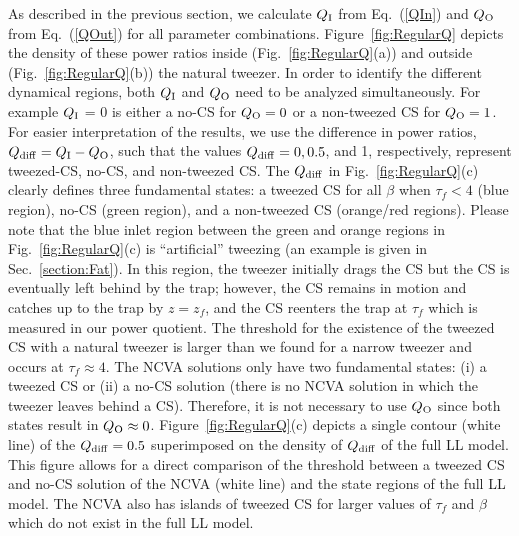 \documentclass[aps,floatfix,showpacs,preprintnumbers,twocolumn,nofootinbib]{revtex4}
\begin{document}
As described in the previous section, we calculate $Q_{\rm I}$ from Eq.~(\ref{QIn}) and $Q_{\rm O}$ from Eq.~(\ref{QOut}) for all parameter combinations.  Figure~\ref{fig:RegularQ} depicts the density of these power ratios inside (Fig.~\ref{fig:RegularQ}(a)) and outside (Fig.~\ref{fig:RegularQ}(b)) the natural tweezer.  In order to identify the different dynamical regions, both $Q_{\rm I}$ and $Q_{\rm O}$ need to be analyzed simultaneously.  For example $Q_{\rm I}$ = 0 is either a no-CS for $Q_{\rm O}=0$ or a non-tweezed CS for $Q_{\rm O}=1$.  For easier interpretation of the results, we use the difference in power ratios, $Q_{\rm diff} = Q_{\rm I} - Q_{\rm O}$, such that the values $Q_{\rm diff} = 0, 0.5$, and 1, respectively, represent tweezed-CS, no-CS, and non-tweezed CS.  The $Q_{\rm diff}$ in Fig.~\ref{fig:RegularQ}(c) clearly defines three fundamental states: a tweezed CS for all $\beta$ when $\tau_f < 4$ (blue region), no-CS (green region), and a non-tweezed CS (orange/red regions).  Please note that the blue inlet region between the green and orange regions in Fig.~\ref{fig:RegularQ}(c) is ``artificial'' tweezing (an example is given in Sec.~\ref{section:Fat}).  In this region, the tweezer initially drags the CS but the CS is eventually left behind by the trap; however, the CS remains in motion and catches up to the trap by $z = z_f$, and the CS reenters the trap at $\tau_f$ which is measured in our power quotient.  The threshold for the existence of the tweezed CS with a natural tweezer is larger than we found for a narrow tweezer and occurs at $\tau_f \approx 4$.  The NCVA solutions only have two fundamental states: (i) a tweezed CS or (ii) a no-CS solution (there is no NCVA solution in which the tweezer leaves behind a CS).  Therefore, it is not necessary to use $Q_{\rm O}$ since both states result in $Q_{\rm O} \approx 0$.  Figure~\ref{fig:RegularQ}(c) depicts a single contour (white line) of the $Q_{\rm diff} = 0.5$ superimposed on the density of $Q_{\rm diff}$ of the full LL model.  This figure allows for a direct comparison of the threshold between a tweezed CS and no-CS solution of the NCVA (white line) and the state regions of the full LL model.  The NCVA also has islands of tweezed CS for larger values of $\tau_f$ and $\beta$ which do not exist in the full LL model.
\end{document}
